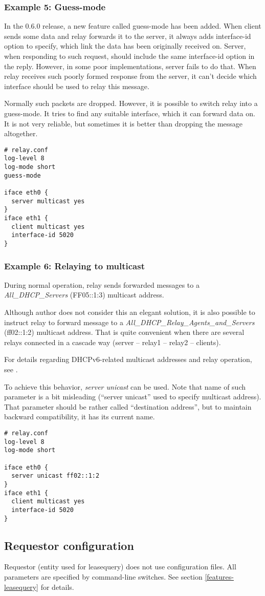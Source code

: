 \subsubsection{Example 5: Guess-mode}
In the 0.6.0 release, a new feature called guess-mode has been
added. When client sends some data and relay forwards it to the
server, it always adds interface-id option to specify, which link
the data has been originally received on. Server, when responding to
such request, should include the same interface-id option in the
reply. However, in some poor implementations, server fails to do
that. When relay receives such poorly formed response from the server,
it can't decide which interface should be used to relay this
message.

Normally such packets are dropped. However, it is possible to switch
relay into a guess-mode. It tries to find any suitable interface,
which it can forward data on. It is not very reliable, but sometimes
it is better than dropping the message altogether.

\begin{lstlisting}
# relay.conf
log-level 8
log-mode short
guess-mode

iface eth0 {
  server multicast yes
}
iface eth1 {
  client multicast yes
  interface-id 5020
}
\end{lstlisting}

\subsubsection{Example 6: Relaying to multicast}
During normal operation, relay sends forwarded messages to a
\emph{All\_DHCP\_Servers} (FF05::1:3) multicast address.

Although author does not consider this an elegant solution, it is also
possible to instruct relay to forward message to a \emph{All\_DHCP\_Relay\_Agents\_and\_Servers}
(ff02::1:2) multicast address. That is quite convenient when there are several
relays connected in a cascade way (server -- relay1 -- relay2 -- clients).

For details regarding DHCPv6-related multicast addresses and relay operation, see \cite{rfc3315}.

To achieve this behavior, \emph{server unicast} can be used. Note that
name of such parameter is a bit misleading (``server unicast'' used to specify
multicast address). That parameter should be rather called ``destination address'',
but to maintain backward compatibility, it has its current name.

\begin{lstlisting}
# relay.conf
log-level 8
log-mode short

iface eth0 {
  server unicast ff02::1:2
}
iface eth1 {
  client multicast yes
  interface-id 5020
}
\end{lstlisting}

\subsection{Requestor configuration}
Requestor (entity used for leasequery) does not use configuration
files. All parameters are specified by command-line switches. See
section \ref{features-leasequery} for details.
